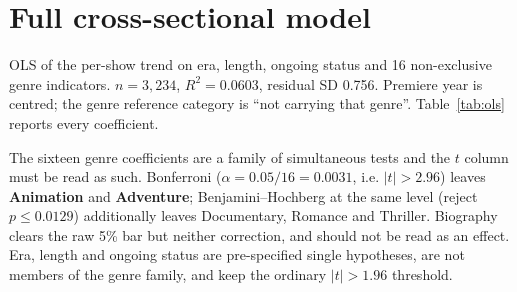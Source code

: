 \documentclass[11pt,a4paper]{article}
\begin{document}
\appendix

\section{Full cross-sectional model}
\label{app:ols}

OLS of the per-show trend on era, length, ongoing status and 16 non-exclusive
genre indicators. $n = 3{,}234$, $R^2 = 0.0603$, residual SD 0.756. Premiere
year is centred; the genre reference category is ``not carrying that genre''.
Table~\ref{tab:ols} reports every coefficient.

The sixteen genre coefficients are a family of simultaneous tests and the $t$
column must be read as such. Bonferroni ($\alpha = 0.05/16 = 0.0031$, i.e.
$|t| > 2.96$) leaves \textbf{Animation} and \textbf{Adventure};
Benjamini--Hochberg at the same level (reject $p \le 0.0129$) additionally leaves
Documentary, Romance and Thriller. Biography clears the raw 5\% bar but neither
correction, and should not be read as an effect. Era, length and ongoing status
are pre-specified single hypotheses, are not members of the genre family, and
keep the ordinary $|t| > 1.96$ threshold.
\end{document}
